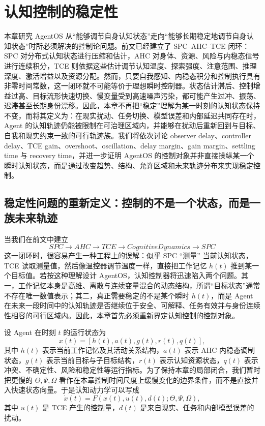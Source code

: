 \chapter{认知控制的稳定性}
\label{chap:cognitive-control-stability}

\begin{chapterlead}
本章研究 AgentOS 从“能够调节自身认知状态”走向“能够长期稳定地调节自身认知状态”时所必须解决的控制论问题。前文已经建立了 SPC--AHC--TCE 闭环：SPC 对分布式认知状态进行压缩和估计，AHC 对身体、资源、风险与内稳态信号进行连续积分，TCE 则依据这些估计调节认知温度、探索强度、注意范围、推理深度、激活增益以及资源分配。然而，只要自我感知、内稳态积分和控制执行具有非零时间常数，这一闭环就不可能等价于理想瞬时控制器。状态估计滞后、控制增益过高、目标流形快速切换、慢变量受到高速噪声污染，都可能产生过冲、振荡、迟滞甚至长期身份漂移。因此，本章不再把“稳定”理解为某一时刻的认知状态保持不变，而将其定义为：在现实扰动、任务切换、模型误差和内部延迟共同存在时，Agent 的认知轨迹仍能被限制在可治理区域内，并能够在扰动后重新回到与目标、自我和现实约束一致的可行轨迹族。我们将依次讨论 observer delay、controller delay、TCE gain、overshoot、oscillation、delay margin、gain margin、settling time 与 recovery time，并进一步证明 AgentOS 的控制对象并非直接操纵某一个瞬时认知状态，而是通过改变趋势、结构、允许区域和未来轨迹分布来实现稳定控制。
\end{chapterlead}

\section{稳定性问题的重新定义：控制的不是一个状态，而是一族未来轨迹}

当我们在前文中建立
\[
SPC
\rightarrow
AHC
\rightarrow
TCE
\rightarrow
CognitiveDynamics
\rightarrow
SPC
\]
这一闭环时，很容易产生一种工程上的误解：似乎 SPC ``测量'' 当前认知状态，TCE 读取测量值，然后像温控器调节温度一样，直接把工作记忆 $h(t)$ 推到某一个目标值。若按这种理解设计 AgentOS，认知控制器将迅速陷入两个问题。其一，工作记忆本身是高维、离散与连续变量混合的动态结构，所谓“目标状态”通常不存在唯一数值表示；其二，真正需要稳定的不是某个瞬时 $h(t)$，而是 Agent 在未来一段时间中的认知轨迹是否继续位于安全、可解释、任务有效并与身份连续性相容的可行区域内。因此，本章首先必须重新界定认知控制的控制对象。

设 Agent 在时刻 $t$ 的运行状态为
\[
x(t)
=
\left[
h(t),
a(t),
g(t),
r(t),
q(t)
\right],
\]
其中 $h(t)$ 表示当前工作记忆及其活动关系结构，$a(t)$ 表示 AHC 内稳态调制状态，$g(t)$ 表示当前目标与子目标结构，$r(t)$ 表示认知资源状态，$q(t)$ 表示冲突、不确定性、风险和稳定性等运行指标。为了保持本章的局部闭合，我们暂时把更慢的 $\Theta,\Psi,\Omega$ 看作在本章控制时间尺度上缓慢变化的边界条件，而不是直接并入快速状态向量。于是认知动力学可以写成
\[
\dot{x}(t)
=
F\!\left(
x(t),
u(t),
d(t);
\Theta,\Psi,\Omega
\right),
\]
其中 $u(t)$ 是 TCE 产生的控制量，$d(t)$ 是来自现实、任务和内部模型误差的扰动。

